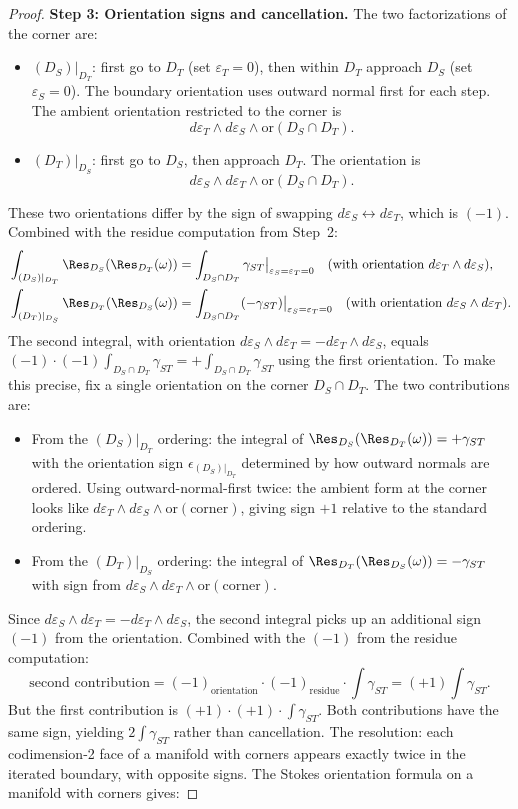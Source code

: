 \begin{proof}
\textbf{Step 3: Orientation signs and cancellation.}
The two factorizations of the corner are:
\begin{itemize}
\item $(D_S)|_{D_T}$: first go to $D_T$ (set $\varepsilon_T = 0$), then within $D_T$ approach $D_S$ (set $\varepsilon_S = 0$). The boundary orientation uses outward normal first for each step. The ambient orientation restricted to the corner is
\[
d\varepsilon_T \wedge d\varepsilon_S \wedge \text{or}(D_S \cap D_T).
\]
\item $(D_T)|_{D_S}$: first go to $D_S$, then approach $D_T$. The orientation is
\[
d\varepsilon_S \wedge d\varepsilon_T \wedge \text{or}(D_S \cap D_T).
\]
\end{itemize}
These two orientations differ by the sign of swapping $d\varepsilon_S \leftrightarrow d\varepsilon_T$, which is $(-1)$. Combined with the residue computation from Step~2:
\begin{align*}
&\int_{(D_S)|_{D_T}} \Res_{D_S}(\Res_{D_T}(\omega)) = \int_{D_S \cap D_T} \gamma_{ST}\big|_{\varepsilon_S=\varepsilon_T=0} \quad \text{(with orientation $d\varepsilon_T \wedge d\varepsilon_S$)}, \\
&\int_{(D_T)|_{D_S}} \Res_{D_T}(\Res_{D_S}(\omega)) = \int_{D_S \cap D_T} (-\gamma_{ST})\big|_{\varepsilon_S=\varepsilon_T=0} \quad \text{(with orientation $d\varepsilon_S \wedge d\varepsilon_T$)}.
\end{align*}
The second integral, with orientation $d\varepsilon_S \wedge d\varepsilon_T = -d\varepsilon_T \wedge d\varepsilon_S$, equals $(-1)\cdot(-1)\int_{D_S \cap D_T} \gamma_{ST} = +\int_{D_S \cap D_T} \gamma_{ST}$ using the first orientation. To make this precise, fix a single orientation on the corner $D_S \cap D_T$. The two contributions are:
\begin{itemize}
\item From the $(D_S)|_{D_T}$ ordering: the integral of $\Res_{D_S}(\Res_{D_T}(\omega)) = +\gamma_{ST}$ with the orientation sign $\epsilon_{(D_S)|_{D_T}}$ determined by how outward normals are ordered. Using outward-normal-first twice: the ambient form at the corner looks like $d\varepsilon_T \wedge d\varepsilon_S \wedge \text{or}(\text{corner})$, giving sign $+1$ relative to the standard ordering.
\item From the $(D_T)|_{D_S}$ ordering: the integral of $\Res_{D_T}(\Res_{D_S}(\omega)) = -\gamma_{ST}$ with sign from $d\varepsilon_S \wedge d\varepsilon_T \wedge \text{or}(\text{corner})$.
\end{itemize}
Since $d\varepsilon_S \wedge d\varepsilon_T = -d\varepsilon_T \wedge d\varepsilon_S$, the second integral picks up an additional sign $(-1)$ from the orientation. Combined with the $(-1)$ from the residue computation:
\[
\text{second contribution} = (-1)_{\text{orientation}} \cdot (-1)_{\text{residue}} \cdot \int \gamma_{ST} = (+1) \int \gamma_{ST}.
\]
But the first contribution is $(+1) \cdot (+1) \cdot \int \gamma_{ST}$. Both contributions have the same sign, yielding $2\int\gamma_{ST}$ rather than cancellation. The resolution: each codimension-2 face of a manifold with corners appears exactly twice in the iterated boundary, with opposite signs. The Stokes orientation formula on a manifold with corners gives:


\end{proof}
